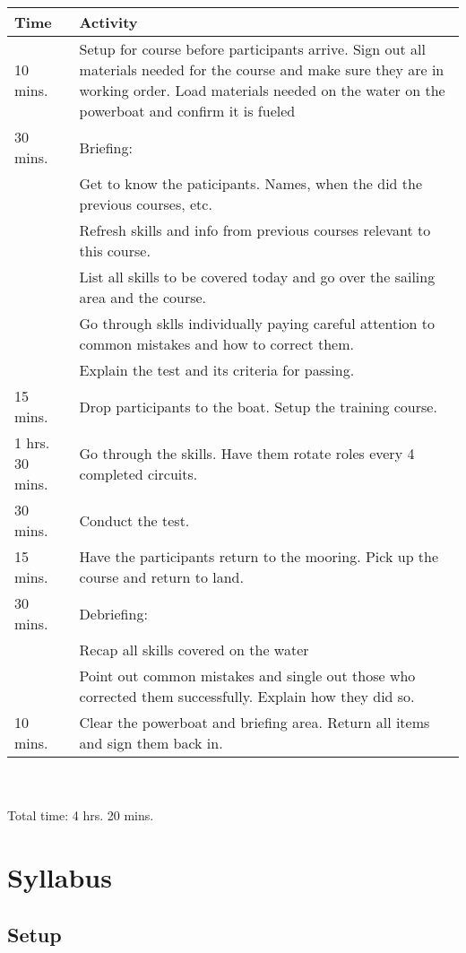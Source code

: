 \documentclass[12pt]{scrartcl}
\begin{document}
\label{tab:schedule}
\begin{tabularx}{\textwidth}{|X|X|}
	\hline
	\textbf{Time} & \textbf{Activity} \\
	\hline
	10 mins. & Setup for course before participants arrive. Sign out all materials needed for the course and make sure they are in working order. Load materials needed on the water on the powerboat and confirm it is fueled \\
	\hline
	30 mins. & Briefing: \\
	& Get to know the paticipants. Names, when the did the previous courses, etc. \\
	& Refresh skills and info from previous courses relevant to this course. \\
	& List all skills to be covered today and go over the sailing area and the course. \\
	& Go through sklls individually paying careful attention to common mistakes and how to correct them. \\
	& Explain the test and its criteria for passing. \\
	\hline
	15 mins. & Drop participants to the boat. Setup the training course. \\
	\hline
	1 hrs. 30 mins. & Go through the skills. Have them rotate roles every 4 completed circuits. \\
	\hline
	30 mins. & Conduct the test. \\
	\hline
	15 mins. & Have the participants return to the mooring. Pick up the course and return to land. \\
	\hline
	30 mins. & Debriefing: \\
	& Recap all skills covered on the water \\
	& Point out common mistakes and single out those who corrected them successfully. Explain how they did so. \\
	\hline
	10 mins. & Clear the powerboat and briefing area. Return all items and sign them back in. \\
	\hline
\end{tabularx}
\\
\\
Total time: 4 hrs. 20 mins.

\newpage

\section{Syllabus} \label{sec:syllabus}

\subsection{Setup} \label{subsec:setup}
\end{document}
